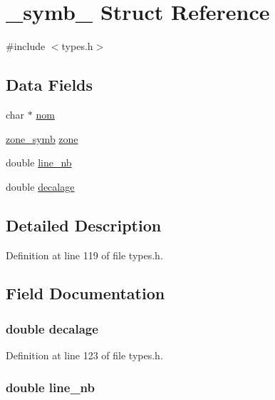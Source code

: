 \hypertarget{struct__symb__}{\section{\-\_\-symb\-\_\- Struct Reference}
\label{struct__symb__}
}


{\ttfamily \#include $<$types.\-h$>$}

\subsection*{Data Fields}
\begin{DoxyCompactItemize}
\item 
char $\ast$ \hyperlink{struct__symb___abe308d273ff51ad86ff02ef3ba3b6f0e}{nom}
\item 
\hyperlink{types_8h_a706120c40630aa23c560dd0144b0f2c0}{zone\-\_\-symb} \hyperlink{struct__symb___a6a70ab3aecc26de50260bd4e04c43c9b}{zone}
\item 
double \hyperlink{struct__symb___a808a37180ef5a21555b2f0f68cf73cb6}{line\-\_\-nb}
\item 
double \hyperlink{struct__symb___aac945295366b3dadfd1ec0da01eb6cb8}{decalage}
\end{DoxyCompactItemize}


\subsection{Detailed Description}


Definition at line 119 of file types.\-h.



\subsection{Field Documentation}
\hypertarget{struct__symb___aac945295366b3dadfd1ec0da01eb6cb8}{
\subsubsection[{decalage}]{\setlength{\rightskip}{0pt plus 5cm}double decalage}}\label{struct__symb___aac945295366b3dadfd1ec0da01eb6cb8}


Definition at line 123 of file types.\-h.

\hypertarget{struct__symb___a808a37180ef5a21555b2f0f68cf73cb6}{
\subsubsection[{line\-\_\-nb}]{\setlength{\rightskip}{0pt plus 5cm}double line\-\_\-nb}}\label{struct__symb___a808a37180ef5a21555b2f0f68cf73cb6}


